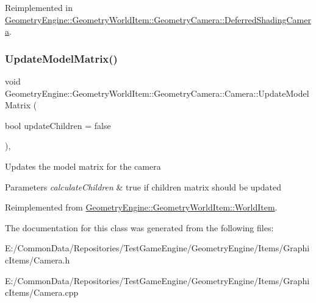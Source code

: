 Reimplemented in \mbox{\hyperlink{class_geometry_engine_1_1_geometry_world_item_1_1_geometry_camera_1_1_deferred_shading_camera_a16da38cfd723b755a63c372c08bbedf7}{Geometry\+Engine\+::\+Geometry\+World\+Item\+::\+Geometry\+Camera\+::\+Deferred\+Shading\+Camera}}.

\mbox{\label{class_geometry_engine_1_1_geometry_world_item_1_1_geometry_camera_1_1_camera_afe7145a1edb13ce3a50c2964f5c865e9}} 
\subsubsection{\texorpdfstring{UpdateModelMatrix()}{UpdateModelMatrix()}}
{\footnotesize\ttfamily void Geometry\+Engine\+::\+Geometry\+World\+Item\+::\+Geometry\+Camera\+::\+Camera\+::\+Update\+Model\+Matrix (\begin{DoxyParamCaption}\item[{bool}]{update\+Children = {\ttfamily false} }\end{DoxyParamCaption})\hspace{0.3cm}{\ttfamily [override]}, {\ttfamily [virtual]}}

Updates the model matrix for the camera 
\begin{DoxyParams}{Parameters}
{\em calculate\+Children} & true if children matrix should be updated \\
\hline
\end{DoxyParams}


Reimplemented from \mbox{\hyperlink{class_geometry_engine_1_1_geometry_world_item_1_1_world_item_a86effd24c41c87be8925ee3addd8c33d}{Geometry\+Engine\+::\+Geometry\+World\+Item\+::\+World\+Item}}.



The documentation for this class was generated from the following files\+:\begin{DoxyCompactItemize}
\item 
E\+:/\+Common\+Data/\+Repositories/\+Test\+Game\+Engine/\+Geometry\+Engine/\+Items/\+Graphic\+Items/Camera.\+h\item 
E\+:/\+Common\+Data/\+Repositories/\+Test\+Game\+Engine/\+Geometry\+Engine/\+Items/\+Graphic\+Items/Camera.\+cpp\end{DoxyCompactItemize}
